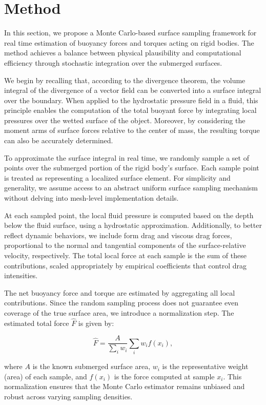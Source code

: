 \section{Method}

In this section, we propose a Monte Carlo-based surface sampling framework for real time estimation of buoyancy forces and torques acting on rigid bodies. The method achieves a balance between physical plausibility and computational efficiency through stochastic integration over the submerged surfaces.

We begin by recalling that, according to the divergence theorem, the volume integral of the divergence of a vector field can be converted into a surface integral over the boundary. When applied to the hydrostatic pressure field in a fluid, this principle enables the computation of the total buoyant force by integrating local pressures over the wetted surface of the object. Moreover, by considering the moment arms of surface forces relative to the center of mass, the resulting torque can also be accurately determined.

To approximate the surface integral in real time, we randomly sample a set of points over the submerged portion of the rigid body's surface. Each sample point is treated as representing a localized surface element. For simplicity and generality, we assume access to an abstract uniform surface sampling mechanism without delving into mesh-level implementation details.

At each sampled point, the local fluid pressure is computed based on the depth below the fluid surface, using a hydrostatic approximation. Additionally, to better reflect dynamic behaviors, we include form drag and viscous drag forces, proportional to the normal and tangential components of the surface-relative velocity, respectively. The total local force at each sample is the sum of these contributions, scaled appropriately by empirical coefficients that control drag intensities.

The net buoyancy force and torque are estimated by aggregating all local contributions. Since the random sampling process does not guarantee even coverage of the true surface area, we introduce a normalization step. The estimated total force \(\hat{F}\) is given by:

\begin{equation}
	\hat{F}=\frac{A}{\sum_i w_i} \sum_{i}w_if(x_i),
\end{equation}

where \(A\) is the known submerged surface area, \(w_i\) is the representative weight (area) of each sample, and \(f(x_i)\) is the force computed at sample \(x_i\). This normalization ensures that the Monte Carlo estimator remains unbiased and robust across varying sampling densities.

